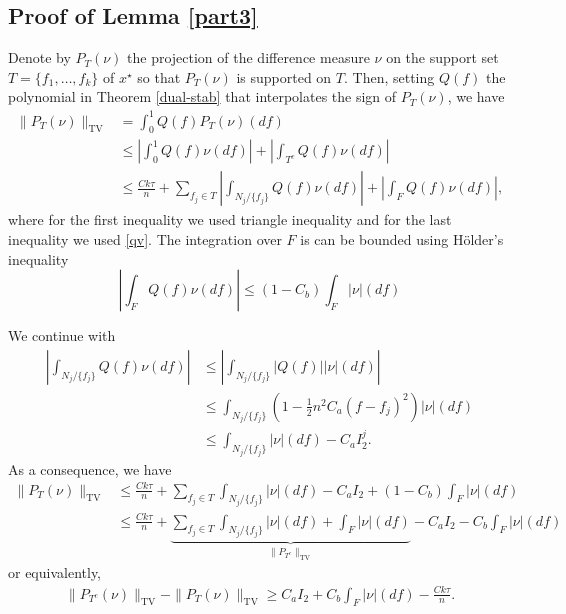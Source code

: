 \subsection{Proof of Lemma \ref{part3}}
\label{apx:pf:I2far}
Denote by $P_T(\nu)$ the projection of the difference measure $\nu$ on the support set $T = \{f_1, \ldots, f_k\}$ of $x^\star$ so that $P_T(\nu)$ is supported on $T$. Then, setting $Q(f)$ the polynomial in Theorem \ref{dual-stab} that interpolates the sign of $P_T( \nu)$, we have
{
\begin{align*}
  \| P_T ( \nu) \|_{\mathrm{TV}} & =  \int_0^1 Q ( f) P_T ( \nu) ( d f)\\
  & \leq  \left| \int_0^1 Q ( f) \nu ( d f) \right| + \left|
  \int_{T^c} Q ( f) \nu ( d f) \right|\\
  & \leq  \frac{C k \tau}{n} + \sum_{f_j \in T} \left|
  \int_{N_j / \{ f_j \}} Q ( f) \nu ( d f) \right| + \left|
  \int_F Q ( f) \nu ( d f) \right|,
\end{align*}}
where for the first inequality we used triangle inequality and for the last inequality we used \eqref{qv}. 
The integration over $F$ is can be bounded using H\"{o}lder's inequality
\[
  \left| \int_{F} Q ( f) \nu ( d f) \right|  
  \leq  ( 1 - C_b) \int_F |\nu|(df)
\]

We continue with
{
\begin{align*}
  \left| \int_{N_j / \{ f_j \}} Q ( f) \nu ( d f) \right| 
  & \leq  \left| \int_{N_j / \{ f_j \}} | Q ( f) | | \nu | ( d f) \right|\\
  & \leq  \int_{N_j / \{ f_j \}} ( 1 - \tfrac{1}{2}n^2 C_a ( f - f_j)^2) | \nu | ( d f)\\
  & \leq \int_{N_j / \{ f_j \}} | \nu | ( d f) - C_a I_2^j.
\end{align*}
}
As a consequence, we have
{
\begin{align*}
  \nonumber \| P_T ( \nu) \|_{\mathrm{TV}} & \leq  \frac{C k \tau}{n} + \sum_{f_j
  \in T} \int_{N_j / \{ f_j \}} | \nu | ( d f) - C_a
  I_2 + ( 1 - C_b) \int_F |\nu|(df) \nonumber\\
 & \leq  \frac{C k \tau}{n} + \underbrace{\sum_{f_j
  \in T} \int_{N_j / \{ f_j \}} | \nu | ( d f) + \int_F |\nu|(df)}_{\|P_{T^c}\|_{\mathrm{TV}}} - C_a
 I_2  - C_b \int_F |\nu|(df)
\end{align*}
}
or equivalently,
\begin{align}
  \label{eqn:lower}
\|P_{T^c}(\nu) \|_{\mathrm{TV}} - \|P_T(\nu)\|_{\mathrm{TV}} \geq C_a I_2 + C_b \int_F |\nu|(df) - \frac{C k\tau}{n}.
\end{align}

